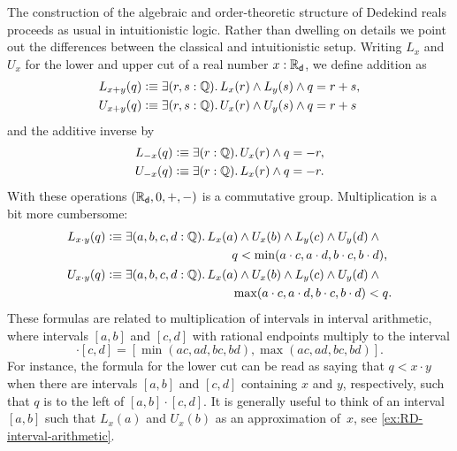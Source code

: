 The construction of the algebraic and order-theoretic structure of Dedekind reals proceeds
as usual in intuitionistic logic. Rather than dwelling on details we point out the
differences between the classical and intuitionistic setup. Writing $L_x$ and $U_x$ for
the lower and upper cut of a real number $x : \mathbb{R}_\mathsf{d}$, we define addition as%
%
\begin{align*}
  L_{x + y}(q) &\defeq \exis{r, s : \Q} L_x(r) \land L_y(s) \land q = r + s, \\
  U_{x + y}(q) &\defeq \exis{r, s : \Q} U_x(r) \land U_y(s) \land q = r + s
\end{align*}
%
and the additive inverse by
%
\begin{align*}
  L_{-x}(q) &\defeq \exis{r : \Q} U_x(r) \land q = - r, \\
  U_{-x}(q) &\defeq \exis{r : \Q} L_x(r) \land q = - r.
\end{align*}
%
With these operations $(\mathbb{R}_\mathsf{d}, 0, {+}, {-})$ is a commutative group. Multiplication is a bit
more cumbersome:
%
\begin{align*}
  L_{x \cdot y}(q) &\defeq
  \begin{aligned}[t]
    \exis{a, b, c, d : \Q} & L_x(a) \land U_x(b) \land L_y(c) \land U_y(d) \land {}\\
                           & \qquad q < \min (a \cdot c, a \cdot d, b \cdot c, b \cdot d),
  \end{aligned} \\
  U_{x \cdot y}(q) &\defeq
  \begin{aligned}[t]
    \exis{a, b, c, d : \Q} & L_x(a) \land U_x(b) \land L_y(c) \land U_y(d) \land {}\\
                           & \qquad \max (a \cdot c, a \cdot d, b \cdot c, b \cdot d) < q.
  \end{aligned}
\end{align*}
%
These formulas are related to multiplication of intervals in interval arithmetic, where
intervals $[a,b]$ and $[c,d]$ with rational endpoints multiply to the interval
%
\begin{equation*}
  [a,b] \cdot [c,d] =
  [\min(a c, a d, b c, b d), \max(a c, a d, b c, b d)].
\end{equation*}
%
For instance, the formula for the lower cut can be read as saying that $q < x \cdot y$
when there are intervals $[a,b]$ and $[c,d]$ containing $x$ and $y$, respectively, such
that $q$ is to the left of $[a,b] \cdot [c,d]$. It is generally useful to think of an
interval $[a,b]$ such that $L_x(a)$ and $U_x(b)$ as an approximation of~$x$, see
\autoref{ex:RD-interval-arithmetic}.

